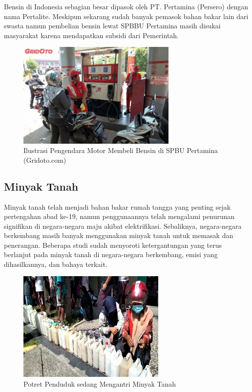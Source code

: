 Bensin di Indonesia sebagian besar dipasok oleh PT. Pertamina (Persero) dengan nama Pertalite. Meskipun sekarang sudah banyak pemasok bahan bakar lain dari swasta namun pembelian bensin lewat SPBBU Pertamina masih disukai masyarakat karena mendapatkan subsidi dari Pemerintah.

\begin{figure}[!ht]
    \centering
    \includegraphics[width=0.7\textwidth]{gambar/isibensin.jpg}
    \caption{Ilustrasi Pengendara Motor Membeli Bensin di SPBU Pertamina (Gridoto.com)}
    \label{fig:ilus-isi-bensin}
\end{figure}

\subsection{Minyak Tanah}
\label{subsec:minyak-tanah-tp}

Minyak tanah telah menjadi bahan bakar rumah tangga yang penting sejak pertengahan abad ke-19, namun penggunaannya telah mengalami penurunan signifikan di negara-negara maju akibat elektrifikasi. Sebaliknya, negara-negara berkembang masih banyak menggunakan minyak tanah untuk memasak dan penerangan. Beberapa studi sudah menyoroti ketergantungan yang terus berlanjut pada minyak tanah di negara-negara berkembang, emisi yang dihasilkannya, dan bahaya terkait.

\begin{figure}[!ht]
    \centering
    \includegraphics[width=0.65\textwidth]{gambar/Minyak-Berita-Maluku-Tengah-1-500x375.jpg}
    \caption{Potret Penduduk sedang Mengantri Minyak Tanah \citep{Radiodms_2021}}
    \label{fig:ilus-antri-minyak-tanah}
\end{figure}

